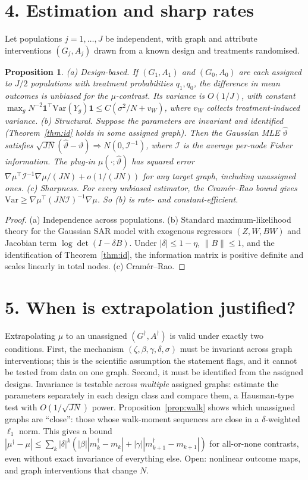 \documentclass[11pt]{article}
\newtheorem{proposition}[theorem]{Proposition}
\theoremstyle{definition}
\begin{document}
\section*{4. Estimation and sharp rates}
Let populations $j=1,\dots,J$ be independent, with graph and attribute interventions $(G_j,A_j)$ drawn from a known design
and treatments randomised.
\begin{proposition}\label{prop:rates}
(a) \emph{Design-based.} If $(G_1,A_1)$ and $(G_0,A_0)$ are each assigned to $J/2$ populations with treatment probabilities
$q_1,q_0$, the difference in mean outcomes is unbiased for the $\mu$-contrast. Its variance is $O(1/J)$, with constant
$\max_g N^{-2}\mathbf 1^\top\mathrm{Var}(Y_g)\mathbf 1\le C(\sigma^2/N+v_W)$, where $v_W$ collects treatment-induced variance.
(b) \emph{Structural.} Suppose the parameters are invariant and identified (Theorem~\ref{thm:id} holds in some assigned
graph). Then the Gaussian MLE $\widehat\vartheta$ satisfies $\sqrt{JN}(\widehat\vartheta-\vartheta)\Rightarrow N(0,\mathcal I^{-1})$,
where $\mathcal I$ is the average per-node Fisher information. The plug-in
$\mu(\cdot;\widehat\vartheta)$ has squared error $\nabla\mu^\top\mathcal I^{-1}\nabla\mu/(JN)+o(1/(JN))$ for
\emph{any} target graph, including unassigned ones.
(c) \emph{Sharpness.} For every unbiased estimator, the Cram\'er--Rao bound gives
$\mathrm{Var}\ge\nabla\mu^\top(JN\mathcal I)^{-1}\nabla\mu$. So (b) is rate- and constant-efficient.
\end{proposition}
\begin{proof}
(a) Independence across populations. (b) Standard maximum-likelihood theory for the Gaussian SAR model with exogenous
regressors $(Z,W,BW)$ and Jacobian term $\log\det(I-\delta B)$. Under $|\delta|\le1-\eta$, $\|B\|\le1$, and the
identification of Theorem~\ref{thm:id}, the information matrix is positive definite and scales linearly in total nodes.
(c) Cram\'er--Rao.
\end{proof}

\section*{5. When is extrapolation justified?}
Extrapolating $\mu$ to an unassigned $(G^\dagger,A^\dagger)$ is valid under exactly two conditions. First, the mechanism
$(\zeta,\beta,\gamma,\delta,\sigma)$ must be invariant across graph interventions; this is the scientific assumption the
statement flags, and it cannot be tested from data on one graph. Second, it must be identified from the assigned designs.
Invariance is testable across \emph{multiple} assigned graphs: estimate the parameters separately in each design class
and compare them, a Hausman-type test with $O(1/\sqrt{JN})$ power. Proposition~\ref{prop:walk} shows which unassigned graphs
are ``close'': those whose walk-moment sequences are close in a $\delta$-weighted $\ell_1$ norm. This gives a bound
$|\mu^\dagger-\mu|\le\sum_k|\delta|^k(|\beta||m_k^\dagger-m_k|+|\gamma||m_{k+1}^\dagger-m_{k+1}|)$ for all-or-none
contrasts, even without exact invariance of everything else. Open: nonlinear outcome maps, and graph interventions that change $N$.
\end{document}
